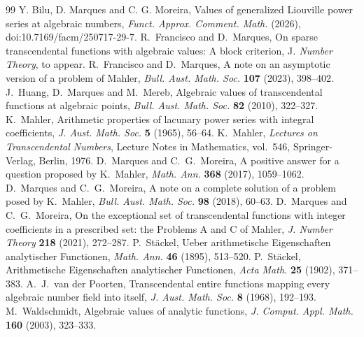 \documentclass[10pt,a4paper]{amsart}
\numberwithin{equation}{section}
\begin{document}
\begin{thebibliography}{99}
 Y. Bilu, D. Marques and C. G. Moreira, Values of generalized Liouville power series at algebraic numbers, \emph{Funct. Approx. Comment. Math.} (2026), doi:10.7169/facm/250717-29-7.
 R.~Francisco and D.~Marques, On sparse transcendental functions with algebraic values: A block criterion, J\textit{. Number Theory}, to appear.
 R.~Francisco and D.~Marques, A note on an asymptotic version of a problem of Mahler, \emph{Bull. Aust. Math. Soc.} \textbf{107} (2023), 398--402.
 J.~Huang, D.~Marques and M.~Mereb, Algebraic values of transcendental functions at algebraic points, \emph{Bull. Aust. Math. Soc.} \textbf{82} (2010), 322--327.
 K.~Mahler, Arithmetic properties of lacunary power series with integral coefficients, \emph{J. Aust. Math. Soc.} \textbf{5} (1965), 56--64.
 K.~Mahler, \emph{Lectures on Transcendental Numbers}, Lecture Notes in Mathematics, vol.~546, Springer-Verlag, Berlin, 1976.
 D.~Marques and C.~G.~Moreira, A positive answer for a question proposed by K.~Mahler, \emph{Math. Ann.} \textbf{368} (2017), 1059--1062.
 D.~Marques and C.~G.~Moreira, A note on a complete solution of a problem posed by K.~Mahler, \emph{Bull. Aust. Math. Soc.} \textbf{98} (2018), 60--63.
 D.~Marques and C.~G.~Moreira, On the exceptional set of transcendental functions with integer coefficients in a prescribed set: the Problems A and C of Mahler, \emph{J. Number Theory} \textbf{218} (2021), 272--287.
 P.~St\"ackel, Ueber arithmetische Eigenschaften analytischer Functionen, \emph{Math. Ann.} \textbf{46} (1895), 513--520.
 P.~St\"ackel, Arithmetische Eigenschaften analytischer Functionen, \emph{Acta Math.} \textbf{25} (1902), 371--383.
 A.~J.~van der Poorten, Transcendental entire functions mapping every algebraic number field into itself, \emph{J. Aust. Math. Soc.} \textbf{8} (1968), 192--193.
 M.~Waldschmidt, Algebraic values of analytic functions, \emph{J. Comput. Appl. Math.} \textbf{160} (2003), 323--333.
\end{thebibliography}
\end{document}
